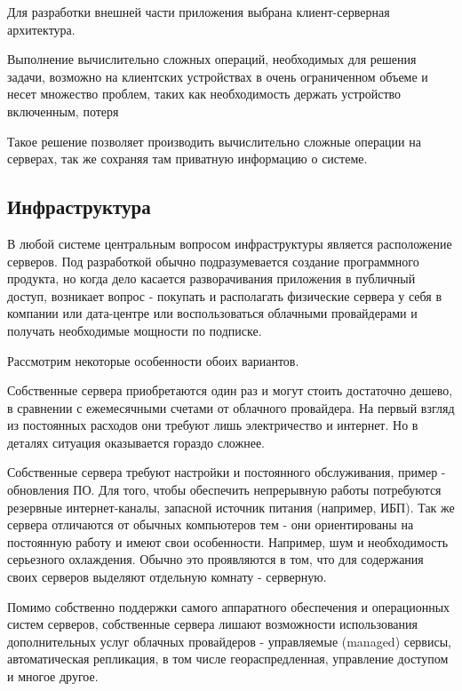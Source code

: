 Для разработки внешней части приложения выбрана клиент-серверная архитектура.

Выполнение вычислительно сложных операций, необходимых для решения задачи, возможно на клиентских устройствах в очень ограниченном объеме и несет множество проблем, таких как необходимость держать устройство включенным, потеря

Такое решение позволяет производить вычислительно сложные операции на серверах, так же сохраняя там приватную информацию о системе.


\subsection{Инфраструктура}

В любой системе центральным вопросом инфраструктуры является расположение серверов. Под разработкой обычно подразумевается создание программного продукта, но когда дело касается разворачивания приложения в публичный доступ, возникает вопрос - покупать и располагать физические сервера у себя в компании или дата-центре или воспользоваться облачными провайдерами и получать необходимые мощности по подписке.

Рассмотрим некоторые особенности обоих вариантов.

Собственные сервера приобретаются один раз и могут стоить достаточно дешево, в сравнении с ежемесячными счетами от облачного провайдера. На первый взгляд из постоянных расходов они требуют лишь электричество и интернет. Но в деталях ситуация оказывается гораздо сложнее.

Собственные сервера требуют настройки и постоянного обслуживания, пример - обновления ПО. Для того, чтобы обеспечить непрерывную работы потребуются резервные интернет-каналы, запасной источник питания (например, ИБП).
Так же сервера отличаются от обычных компьютеров тем - они ориентированы на постоянную работу и имеют свои особенности. Например, шум и необходимость серьезного охлаждения. Обычно это проявляются в том, что для содержания своих серверов выделяют отдельную комнату - серверную.

Помимо собственно поддержки самого аппаратного обеспечения и операционных систем серверов, собственные сервера лишают возможности использования дополнительных услуг облачных провайдеров - управляемые (managed) сервисы, автоматическая репликация, в том числе геораспредленная, управление доступом и многое другое.

